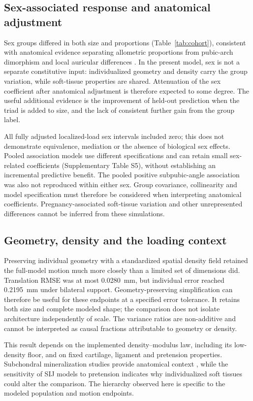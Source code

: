 \subsection*{Sex-associated response and anatomical adjustment}
Sex groups differed in both size and proportions (Table~\ref{tab:cohort}), consistent with anatomical evidence separating allometric proportions from pubic-arch dimorphism \citep{Fischer2017} and local auricular differences \citep{Nishi2020}. In the present model, sex is not a separate constitutive input: individualized geometry and density carry the group variation, while soft-tissue properties are shared. Attenuation of the sex coefficient after anatomical adjustment is therefore expected to some degree. The useful additional evidence is the improvement of held-out prediction when the triad is added to size, and the lack of consistent further gain from the group label.

All fully adjusted localized-load sex intervals included zero; this does not demonstrate equivalence, mediation or the absence of biological sex effects. Pooled association models use different specifications and can retain small sex-related coefficients (Supplementary Table S5), without establishing an incremental predictive benefit. The pooled positive subpubic-angle association was also not reproduced within either sex. Group covariance, collinearity and model specification must therefore be considered when interpreting anatomical coefficients. Pregnancy-associated soft-tissue variation and other unrepresented differences cannot be inferred from these simulations.

\subsection*{Geometry, density and the loading context}
Preserving individual geometry with a standardized spatial density field retained the full-model motion much more closely than a limited set of dimensions did. Translation RMSE was at most 0.0280~mm, but individual error reached 0.2195~mm under bilateral support. Geometry-preserving simplification can therefore be useful for these endpoints at a specified error tolerance. It retains both size and complete modeled shape; the comparison does not isolate architecture independently of scale. The variance ratios are non-additive and cannot be interpreted as causal fractions attributable to geometry or density.

This result depends on the implemented density--modulus law, including its low-density floor, and on fixed cartilage, ligament and pretension properties. Subchondral mineralization studies provide anatomical context \citep{Poilliot2023}, while the sensitivity of SIJ models to pretension \citep{Heyland2025} indicates why individualized soft tissues could alter the comparison. The hierarchy observed here is specific to the modeled population and motion endpoints.

